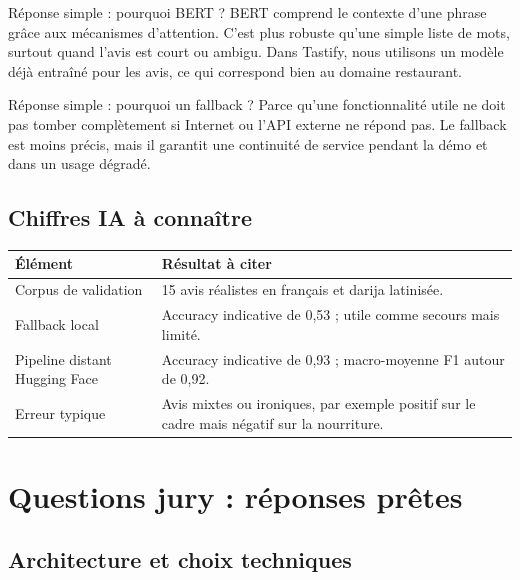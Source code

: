 \documentclass[10pt,a4paper]{article}
\begin{document}
\begin{phrasebox}{Réponse simple : pourquoi BERT ?}
BERT comprend le contexte d'une phrase grâce aux mécanismes d'attention. C'est plus robuste qu'une simple liste de mots, surtout quand l'avis est court ou ambigu. Dans Tastify, nous utilisons un modèle déjà entraîné pour les avis, ce qui correspond bien au domaine restaurant.
\end{phrasebox}

\begin{phrasebox}{Réponse simple : pourquoi un fallback ?}
Parce qu'une fonctionnalité utile ne doit pas tomber complètement si Internet ou l'API externe ne répond pas. Le fallback est moins précis, mais il garantit une continuité de service pendant la démo et dans un usage dégradé.
\end{phrasebox}

\subsection{Chiffres IA à connaître}

\begin{tabularx}{\textwidth}{p{5.2cm}Y}
\toprule
\textbf{Élément} & \textbf{Résultat à citer} \\
\midrule
Corpus de validation & 15 avis réalistes en français et darija latinisée. \\
Fallback local & Accuracy indicative de 0,53 ; utile comme secours mais limité. \\
Pipeline distant Hugging Face & Accuracy indicative de 0,93 ; macro-moyenne F1 autour de 0,92. \\
Erreur typique & Avis mixtes ou ironiques, par exemple positif sur le cadre mais négatif sur la nourriture. \\
\bottomrule
\end{tabularx}

\section{Questions jury : réponses prêtes}

\subsection{Architecture et choix techniques}
\end{document}
